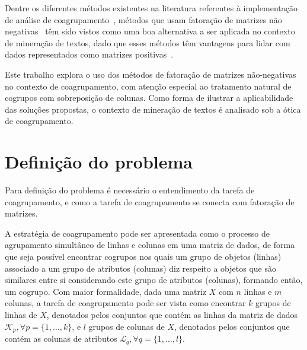 \documentclass[
    12pt,                %
    oneside,            %
    a4paper,            %
    english,            %
    brazil                %
    ]{abntex2ppgsi}
\begin{document}
Dentre os diferentes métodos existentes na literatura referentes à implementação de análise de coagrupamento~\cite{Franca2010,Mirkin1996,Madeira2004}, métodos que usam fatoração de matrizes não negativas~\cite{lee:nnmf00,lee99} têm sido vistos como uma boa alternativa a ser aplicada no contexto de mineração de textos, dado que esses métodos têm vantagens para lidar com dados representados como matrizes positivas~\cite{Xu2003,Shahnaz2006373,Yoo2010}.

Este trabalho explora o uso dos métodos de fatoração de matrizes não-negativas no contexto de coagrupamento, com atenção especial ao tratamento natural de cogrupos com sobreposição de colunas.
Como forma de ilustrar a aplicabilidade das soluções propostas, o contexto de mineração de textos é analisado sob a ótica de coagrupamento.


\section{Definição do problema}
\label{sec:problemdef}




Para definição do problema é necessário o entendimento da tarefa de coagrupamento, e como a tarefa de coagrupamento se conecta com fatoração de matrizes.

A estratégia de coagrupamento pode ser apresentada como o processo de agrupamento simultâneo de linhas e colunas em uma matriz de dados, de forma que seja possível encontrar cogrupos nos quais um grupo de objetos (linhas) associado a um grupo de atributos (colunas) diz respeito a objetos que são similares entre si considerando este grupo de atributos (colunas), formando então, um cogrupo.
Com maior formalidade, dada uma matriz $X$ com $n$ linhas e $m$ colunas, a tarefa de coagrupamento pode ser vista como encontrar $k$ grupos de linhas de $X$, denotados pelos conjuntos que contém as linhas da matriz de dados $\mathcal{K}_p, \forall p = \{1, \dots, k\}$, e $l$ grupos de colunas de $X$, denotados pelos conjuntos que contém as colunas de atributos $\mathcal{L}_q, \forall q = \{1, \dots, l\}$.
\end{document}
